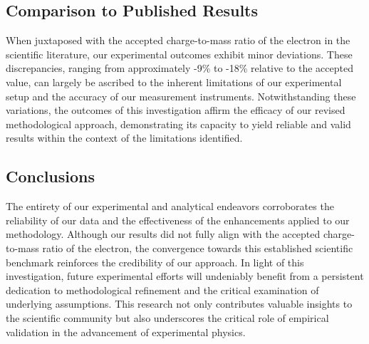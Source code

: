 \documentclass{article}
\begin{document}
\subsection{Comparison to Published Results}
\label{subsec:comparison-published-results}

When juxtaposed with the accepted charge-to-mass ratio of the electron in the scientific literature, our experimental outcomes exhibit minor deviations. These discrepancies, ranging from approximately -9\% to -18\% relative to the accepted value, can largely be ascribed to the inherent limitations of our experimental setup and the accuracy of our measurement instruments. Notwithstanding these variations, the outcomes of this investigation affirm the efficacy of our revised methodological approach, demonstrating its capacity to yield reliable and valid results within the context of the limitations identified.

\subsection{Conclusions}
\label{subsec:conclusions}

The entirety of our experimental and analytical endeavors corroborates the reliability of our data and the effectiveness of the enhancements applied to our methodology. Although our results did not fully align with the accepted charge-to-mass ratio of the electron, the convergence towards this established scientific benchmark reinforces the credibility of our approach. In light of this investigation, future experimental efforts will undeniably benefit from a persistent dedication to methodological refinement and the critical examination of underlying assumptions. This research not only contributes valuable insights to the scientific community but also underscores the critical role of empirical validation in the advancement of experimental physics.


\printbibliography[heading=bibintoc, title={References}]
\end{document}
